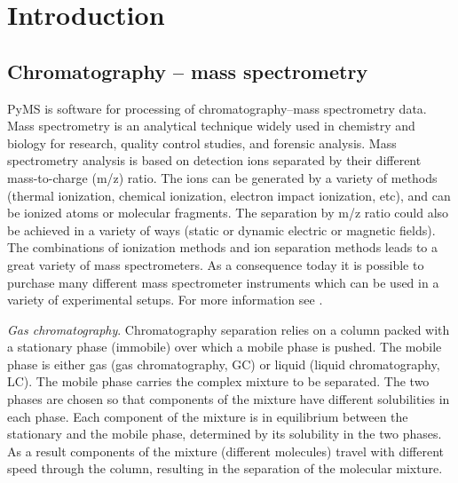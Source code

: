 

\chapter{Introduction}

\section{Chromatography -- mass spectrometry}

PyMS is software for processing of chromatography--mass spectrometry
data. Mass spectrometry is an analytical technique widely used in chemistry
and biology for research, quality control studies, and forensic analysis.
Mass spectrometry analysis is based on detection ions separated by 
their different mass-to-charge (m/z) ratio. The ions can be generated
by a variety of methods (thermal ionization, chemical ionization,
electron impact ionization, etc), and can be ionized atoms or molecular
fragments. The separation by m/z ratio could also be achieved in a
variety of ways (static or dynamic electric or magnetic fields). The
combinations of ionization methods and ion separation methods leads
to a great variety of mass spectrometers. As a consequence today it
is possible to purchase many different mass spectrometer instruments
which can be used in a variety of experimental setups. For more
information see \cite{gross04}.

{\em Gas chromatography}.
Chromatography separation relies on a column packed with a stationary
phase (immobile) over which a mobile phase is pushed. The mobile phase
is either gas (gas chromatography, GC) or liquid (liquid chromatography,
LC). The mobile phase carries the complex mixture to be separated. The
two phases are chosen so that components of the mixture have different
solubilities in each phase. Each component of the mixture is in
equilibrium between the stationary and the mobile phase, determined
by its solubility in the two phases. As a result components of the
mixture (different molecules) travel with different speed through
the column, resulting in the separation of the molecular mixture.

